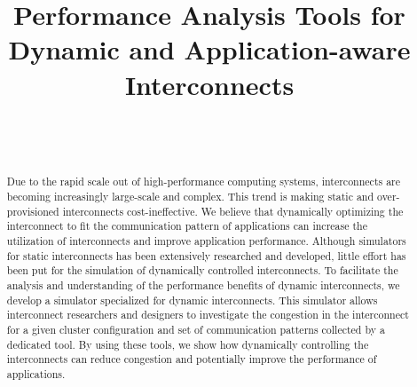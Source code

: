 \documentclass[10pt, a4paper]{IEEEtran}
\begin{document}
\title{Performance Analysis Tools for Dynamic and Application-aware Interconnects}

\author{%
     \\
     \\
}

\maketitle

\begin{abstract}
    Due to the rapid scale out of high-performance computing systems,
    interconnects are becoming increasingly large-scale and complex. This
    trend is making static and over-provisioned interconnects
    cost-ineffective. We believe that dynamically optimizing the interconnect
    to fit the communication pattern of applications can increase the
    utilization of interconnects and improve application performance. Although
    simulators for static interconnects has been extensively researched and
    developed, little effort has been put for the simulation of dynamically
    controlled interconnects. To facilitate the analysis and understanding of
    the performance benefits of dynamic interconnects, we develop a simulator
    specialized for dynamic interconnects. This simulator allows interconnect
    researchers and designers to investigate the congestion in the
    interconnect for a given cluster configuration and set of communication
    patterns collected by a dedicated tool. By using these tools, we show how
    dynamically controlling the  interconnects can reduce congestion and
    potentially improve the performance of applications.
\end{abstract}
\end{document}
